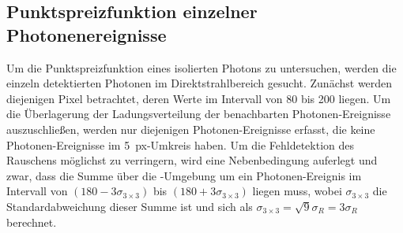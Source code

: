 \subsection{Punktspreizfunktion einzelner Photonenereignisse}
\label{text:punktspreizfunktion}
Um die Punktspreizfunktion eines isolierten Photons zu untersuchen, werden die einzeln detektierten Photonen im  Direktstrahlbereich gesucht. Zunächst werden diejenigen Pixel betrachtet, deren Werte im Intervall von \SI{80}{\adu} bis \SI{200}{\adu} liegen. Um die Überlagerung der Ladungsverteilung der benachbarten Photonen-Ereignisse auszuschließen, werden nur diejenigen Photonen-Ereignisse erfasst, die keine Photonen-Ereignisse im \SI{5}{px}-Umkreis haben. Um die Fehldetektion des Rauschens möglichst zu verringern, wird eine Nebenbedingung auferlegt und zwar, dass die Summe über die -Umgebung um ein  Photonen-Ereignis im Intervall von $(180-3\sigma_{3\times 3})$ \si{\adu} bis $(180+3\sigma_{3\times 3})$ \si{\adu} liegen muss, wobei $\sigma_{3\times 3}$ die Standardabweichung dieser Summe ist und sich als $\sigma_{3\times 3} = \sqrt{9}\sigma_R = 3 \sigma_R$ berechnet.


